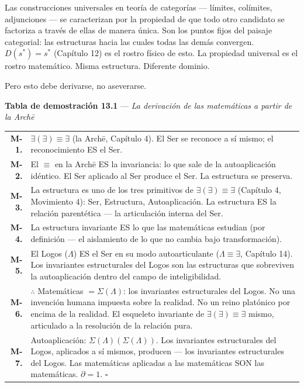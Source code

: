 \documentclass[10pt, openany, oneside]{book}
\renewcommand{\footnotesize}{\fontsize{8.5}{11}\selectfont}
\begin{document}
Las construcciones universales en teoría de categorías --- límites, colímites, adjunciones --- se caracterizan por la propiedad de que todo otro candidato se factoriza a través de ellas de manera única. Son los puntos fijos del paisaje categorial: las estructuras hacia las cuales todas las demás convergen. $D(s^*) = s^*$ (Capítulo 12) es el rostro físico de esto. La propiedad universal es el rostro matemático. Misma estructura. Diferente dominio.

Pero esto debe derivarse, no aseverarse.

\vspace{0.5em}

\textbf{Tabla de demostración 13.1} --- \textit{La derivación de las matemáticas a partir de la Arch\={e}}

\vspace{0.5em}

{\footnotesize
\noindent\begin{tabular}{r p{}}
\textbf{M-1.} & $\exists(\exists) \equiv \exists$ (la Arch\={e}, Capítulo 4). El Ser se reconoce a sí mismo; el reconocimiento ES el Ser. \\[0.3em]
\textbf{M-2.} & El $\equiv$ en la Arch\={e} ES la invariancia: lo que sale de la autoaplicación idéntico. El Ser aplicado al Ser produce el Ser. La estructura se preserva. \\[0.3em]
\textbf{M-3.} & La estructura es uno de los tres primitivos de $\exists(\exists) \equiv \exists$ (Capítulo 4, Movimiento 4): Ser, Estructura, Autoaplicación. La estructura ES la relación parentética --- la articulación interna del Ser. \\[0.3em]
\textbf{M-4.} & La estructura invariante ES lo que las matemáticas estudian (por definición --- el aislamiento de lo que no cambia bajo transformación). \\[0.3em]
\textbf{M-5.} & El Logos ($\Lambda$) ES el Ser en su modo autoarticulante ($\Lambda \equiv \exists$, Capítulo 14). Los invariantes estructurales del Logos son las estructuras que sobreviven la autoaplicación dentro del campo de inteligibilidad. \\[0.3em]
\textbf{M-6.} & $\therefore$ Matemáticas $= \Sigma(\Lambda)$: los invariantes estructurales del Logos. No una invención humana impuesta sobre la realidad. No un reino platónico por encima de la realidad. El esqueleto invariante de $\exists(\exists) \equiv \exists$ mismo, articulado a la resolución de la relación pura. \\[0.3em]
\textbf{M-7.} & Autoaplicación: $\Sigma(\Lambda)(\Sigma(\Lambda))$. Los invariantes estructurales del Logos, aplicados a sí mismos, producen --- los invariantes estructurales del Logos. Las matemáticas aplicadas a las matemáticas SON las matemáticas. $\partial = 1$. $\square$ \\[0.3em]
\end{tabular}
}
\end{document}
